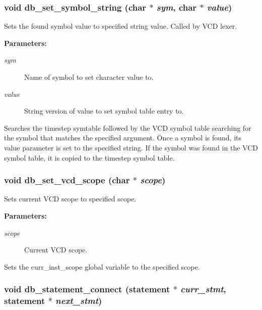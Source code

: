 \subsubsection{\setlength{\rightskip}{0pt plus 5cm}void db\_\-set\_\-symbol\_\-string (char $\ast$ {\em sym}, char $\ast$ {\em value})}\label{db_8c_a41}


Sets the found symbol value to specified string value. Called by VCD lexer.

\begin{Desc}
\item[{\bf Parameters: }]\par
\begin{description}
\item[
{\em sym}]Name of symbol to set character value to. \item[
{\em value}]String version of value to set symbol table entry to.

\end{description}
\end{Desc}
Searches the timestep symtable followed by the VCD symbol table searching for the symbol that matches the specified argument. Once a symbol is found, its value parameter is set to the specified string. If the symbol was found in the VCD symbol table, it is copied to the timestep symbol table. 
\subsubsection{\setlength{\rightskip}{0pt plus 5cm}void db\_\-set\_\-vcd\_\-scope (char $\ast$ {\em scope})}\label{db_8c_a37}


Sets current VCD scope to specified scope.

\begin{Desc}
\item[{\bf Parameters: }]\par
\begin{description}
\item[
{\em scope}]Current VCD scope.

\end{description}
\end{Desc}
Sets the curr\_\-inst\_\-scope global variable to the specified scope. 
\subsubsection{\setlength{\rightskip}{0pt plus 5cm}void db\_\-statement\_\-connect ({\bf statement} $\ast$ {\em curr\_\-stmt}, {\bf statement} $\ast$ {\em next\_\-stmt})}\label{db_8c_a35}


